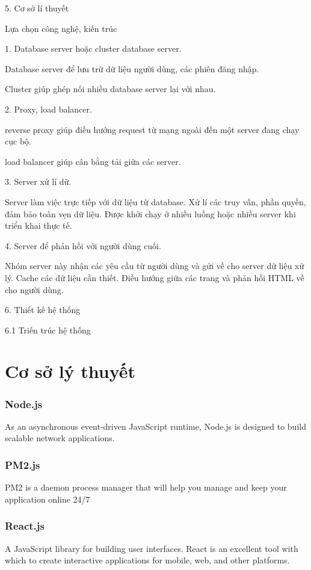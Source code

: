 \documentclass{report}
\begin{document}
5. Cơ sở lí thuyết

Lựa chọn công nghệ, kiến trúc

1. Database server hoặc cluster database server.

Database server để lưu trữ dữ liệu người dùng, các phiên đăng nhập.

Cluster giúp ghép nối nhiều database server lại với nhau.

2. Proxy, load balancer.

reverse proxy giúp điều hướng request từ mạng ngoài đến một server đang chạy cục bộ.

load balancer giúp cân bằng tải giữa các server.

3. Server xử lí dữ.

Server làm việc trực tiếp với dữ liệu từ database. Xử lí các truy vấn,
phần quyền, đảm bảo toàn vẹn dữ liệu. Được khởi chạy ở nhiều luồng
hoặc nhiều server khi triển khai thực tế.

4. Server để phản hồi với người dùng cuối.

Nhóm server này nhận các yêu cầu từ người dùng và gửi về cho server dữ liệu xử lý.
Cache các dữ liệu cần thiết. Điều hướng giữa các trang và phản hồi HTML về cho người dùng.

6. Thiết kế hệ thống

6.1 Triến trúc hệ thống





\part{Cơ sở lý thuyết}



\section{Node.js}
As an asynchronous event-driven JavaScript runtime, Node.js \cite{web:node:about} is designed to build scalable network applications.
\section{PM2.js}
PM2 \cite{web:pm2:home} is a daemon process manager that will help you manage and keep your application online 24/7
\section{React.js} 
A JavaScript library for building user interfaces. React \cite{web:react:why} is an excellent tool with which to create interactive applications for mobile, web, and other platforms.
\end{document}
